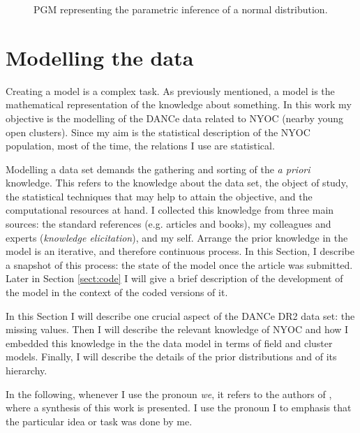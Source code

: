 \begin{figure}[htbp]
\begin{center}
\caption{PGM representing the parametric inference of a normal distribution.}
\label{fig:pgm}
\end{center}
\end{figure}

\section{Modelling the data}
\label{sect:datamodelling}
Creating a model is a complex task. As previously mentioned, a model is the mathematical representation of the knowledge about something. In this work my objective is the modelling of the DANCe data related to NYOC (nearby young open clusters). Since my aim is  the statistical description of the NYOC population, most of the time, the relations I use are statistical.

Modelling a data set demands the gathering and sorting of the \emph{a priori} knowledge. This refers to the knowledge about the data set, the object of study, the statistical techniques that may help to attain the objective, and the computational resources at hand. I collected this knowledge from three main sources: the standard references (e.g. articles and books), my colleagues and experts (\emph{knowledge elicitation}), and my self. Arrange the prior knowledge in the model is an iterative, and therefore continuous process. In this Section, I describe a snapshot of this process: the state of the model once the article \citet{Olivares2017} was submitted. Later in Section \ref{sect:code} I will give a brief description of the development of the model in the context of the coded versions of it.

In this Section I will describe one crucial aspect of the DANCe DR2 data set: the missing values. Then I will describe the relevant knowledge of NYOC and how I embedded this knowledge in the the data model in terms of field and cluster models. Finally, I will describe the details of the prior distributions and of its hierarchy. 

In the following, whenever I use the pronoun \emph{we}, it refers to the authors of \citet{Olivares2017}, where a synthesis of this work is presented. I use the pronoun I to emphasis that the particular idea or task was done by me.

